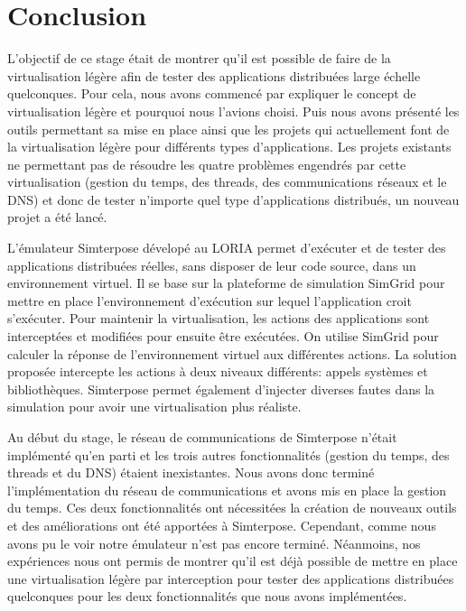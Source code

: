 \section{Conclusion}
\label{section:ccl}

L'objectif de ce stage était de montrer qu'il est possible de faire de la
virtualisation légère afin de tester des applications distribuées large échelle quelconques. Pour cela, nous avons commencé par expliquer le concept de
virtualisation légère et pourquoi nous l'avions choisi. Puis nous avons présenté
les outils permettant sa mise en place ainsi que les projets qui actuellement
font de la virtualisation légère pour différents types d'applications. Les
projets existants ne permettant pas de résoudre les quatre problèmes engendrés
par cette virtualisation (gestion du temps, des threads, des communications
réseaux et le DNS) et donc de tester n'importe quel type d'applications
distribués, un nouveau projet a été lancé.

L'émulateur Simterpose dévelopé au LORIA permet d'exécuter et de tester des
applications distribuées réelles, sans disposer de leur code source, dans un
environnement virtuel. Il se base sur la plateforme de simulation SimGrid pour
mettre en place l'environnement d'exécution sur lequel l'application croit s'exécuter. Pour maintenir la virtualisation, les actions des applications sont
interceptées et modifiées pour ensuite être exécutées. On utilise SimGrid pour
calculer la réponse de l'environnement virtuel aux différentes actions. La
solution proposée intercepte les actions à deux niveaux différents: appels
systèmes et bibliothèques. Simterpose permet également d'injecter diverses
fautes dans la simulation pour avoir une virtualisation plus réaliste.

Au début du stage, le réseau de communications de Simterpose n'était implémenté
qu'en parti et les trois autres fonctionnalités (gestion du temps, des threads
et du DNS) étaient inexistantes. Nous avons donc terminé l'implémentation du
réseau de communications et avons mis en place la gestion du temps. Ces deux
fonctionnalités ont nécessitées la création de nouveaux outils et des
améliorations ont été apportées à Simterpose. Cependant, comme nous avons pu le
voir notre émulateur n'est pas encore terminé. Néanmoins, nos expériences nous
ont permis de montrer qu'il est déjà possible de mettre en place une
virtualisation légère par interception pour tester des applications distribuées
quelconques pour les deux fonctionnalités que nous avons implémentées.
